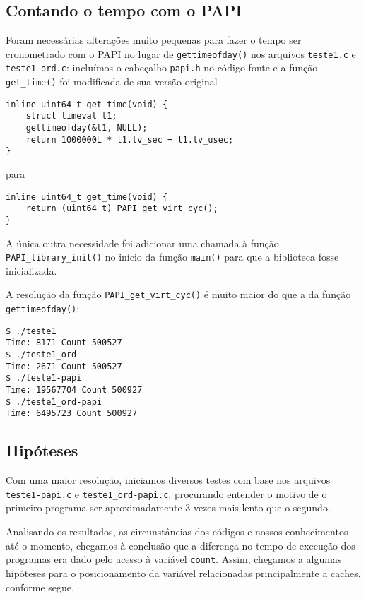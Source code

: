 \documentclass[a4paper,oneside,12pt]{article}
\begin{document}
\subsection{Contando o tempo com o PAPI}

Foram necessárias alterações muito pequenas para fazer o tempo ser cronometrado com o PAPI no lugar de {\tt gettimeofday()} nos arquivos {\tt teste1.c} e {\tt teste1\_ord.c}: incluímos o cabeçalho {\tt papi.h} no código-fonte e a função {\tt get\_time()} foi modificada de sua versão original

\begin{verbatim}
inline uint64_t get_time(void) {
    struct timeval t1;
    gettimeofday(&t1, NULL);
    return 1000000L * t1.tv_sec + t1.tv_usec;
}
\end{verbatim}

para

\begin{verbatim}
inline uint64_t get_time(void) { 
    return (uint64_t) PAPI_get_virt_cyc();
}  
\end{verbatim}

A única outra necessidade foi adicionar uma chamada à função {\tt PAPI\_library\_init()} no início da função {\tt main()} para que a biblioteca fosse inicializada.

A resolução da função {\tt PAPI\_get\_virt\_cyc()} é muito maior do que a da função {\tt gettimeofday()}:

\begin{verbatim}
$ ./teste1
Time: 8171 Count 500527
$ ./teste1_ord
Time: 2671 Count 500527
$ ./teste1-papi
Time: 19567704 Count 500927
$ ./teste1_ord-papi
Time: 6495723 Count 500927
\end{verbatim}

\subsection{Hipóteses}

Com uma maior resolução, iniciamos diversos testes com base nos arquivos {\tt teste1-papi.c} e {\tt teste1\_ord-papi.c}, procurando entender o motivo de o primeiro programa ser aproximadamente 3 vezes mais lento que o segundo.

Analisando os resultados, as circunstâncias dos códigos e nossos conhecimentos até o momento, chegamos à conclusão que a diferença no tempo de execução dos programas era dado pelo acesso à variável {\tt count}. Assim, chegamos a algumas hipóteses para o posicionamento da variável relacionadas principalmente a caches, conforme segue.
\end{document}
